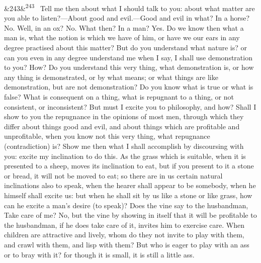\documentclass[12pt]{article}
\newcommand{\para}[1][]{\par\noindent\ifx&#1&\else\textsuperscript{\footnotesize #1}~\fi}
\begin{document}
\para[243] Tell me then about what I should talk to you: about what matter are you able to listen?—About good and evil.—Good and evil in what? In a horse? No. Well, in an ox? No. What then? In a man? Yes. Do we know then what a man is, what the notion is which we have of him, or have we our ears in any degree practised about this matter? But do you understand what nature is? or can you even in any degree understand me when I say, I shall use demonstration to you? How? Do you understand this very thing, what demonstration is, or how any thing is demonstrated, or by what means; or what things are like demonstration, but are not demonstration? Do you know what is true or what is false? What is consequent on a thing, what is repugnant to a thing, or not consistent, or inconsistent? But must I excite you to philosophy, and how? Shall I show to you the repugnance in the opinions of most men, through which they differ about things good and evil, and about things which are profitable and unprofitable, when you know not this very thing, what repugnance (contradiction) is? Show me then what I shall accomplish by discoursing with you: excite my inclination to do this. As the grass which is suitable, when it is presented to a sheep, moves its inclination to eat, but if you present to it a stone or bread, it will not be moved to eat; so there are in us certain natural inclinations also to speak, when the hearer shall appear to be somebody, when he himself shall excite us: but when he shall sit by us like a stone or like grass, how can he excite a man's desire (to speak)? Does the vine say to the husbandman, Take care of me? No, but the vine by showing in itself that it will be profitable to the husbandman, if he does take care of it, invites him to exercise care. When children are attractive and lively, whom do they not invite to play with them, and crawl with them, and lisp with them? But who is eager to play with an ass or to bray with it? for though it is small, it is still a little ass.
\end{document}
